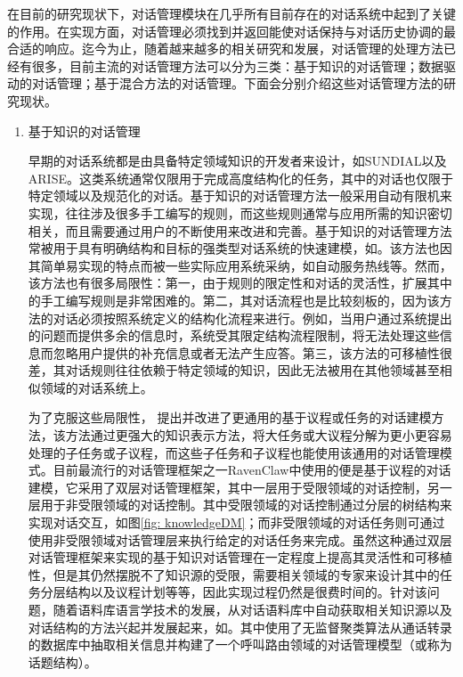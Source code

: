 在目前的研究现状下，对话管理模块在几乎所有目前存在的对话系统中起到了关键的作用。在实现方面，对话管理必须找到并返回能使对话保持与对话历史协调的最合适的响应。迄今为止，随着越来越多的相关研究和发展，对话管理的处理方法已经有很多，目前主流的对话管理方法可以分为三类：基于知识的对话管理；数据驱动的对话管理；基于混合方法的对话管理。下面会分别介绍这些对话管理方法的研究现状。

\begin{enumerate}

\item 基于知识的对话管理

早期的对话系统都是由具备特定领域知识的开发者来设计，如SUNDIAL\cite{Peckham1993}以及ARISE\cite{Lamel1999}。这类系统通常仅限用于完成高度结构化的任务，其中的对话也仅限于特定领域以及规范化的对话。基于知识的对话管理方法一般采用自动有限机来实现，往往涉及很多手工编写的规则，而这些规则通常与应用所需的知识密切相关，而且需要通过用户的不断使用来改进和完善。基于知识的对话管理方法常被用于具有明确结构和目标的强类型对话系统的快速建模，如\cite{McTear1998}。该方法也因其简单易实现的特点而被一些实际应用系统采纳，如自动服务热线等。然而，该方法也有很多局限性：第一，由于规则的限定性和对话的灵活性，扩展其中的手工编写规则是非常困难的。第二，其对话流程也是比较刻板的，因为该方法的对话必须按照系统定义的结构化流程来进行。例如，当用户通过系统提出的问题而提供多余的信息时，系统受其限定结构流程限制，将无法处理这些信息而忽略用户提供的补充信息或者无法产生应答。第三，该方法的可移植性很差，其对话规则往往依赖于特定领域的知识，因此无法被用在其他领域甚至相似领域的对话系统上。

为了克服这些局限性，\cite{RichSidner1998, BohusRudnicky2003, Bui2004, LarssonTraum2006} 提出并改进了更通用的基于议程或任务的对话建模方法，该方法通过更强大的知识表示方法，将大任务或大议程分解为更小更容易处理的子任务或子议程，而这些子任务和子议程也能使用该通用的对话管理模式。目前最流行的对话管理框架之一RavenClaw\cite{BohusRudnicky2009}中使用的便是基于议程的对话建模，它采用了双层对话管理框架，其中一层用于受限领域的对话控制，另一层用于非受限领域的对话控制。其中受限领域的对话控制通过分层的树结构来实现对话交互，如图\ref{fig: knowledgeDM}；而非受限领域的对话任务则可通过使用非受限领域对话管理层来执行给定的对话任务来完成。虽然这种通过双层对话管理框架来实现的基于知识对话管理在一定程度上提高其灵活性和可移植性，但是其仍然摆脱不了知识源的受限，需要相关领域的专家来设计其中的任务分层结构以及议程计划等等，因此实现过程仍然是很费时间的。针对该问题，随着语料库语言学技术的发展，从对话语料库中自动获取相关知识源以及对话结构的方法兴起并发展起来，如\cite{RoySubramaniam2006, Bangalore2006, Lee2009a, Griol2009}。其中\cite{RoySubramaniam2006}使用了无监督聚类算法从通话转录的数据库中抽取相关信息并构建了一个呼叫路由领域的对话管理模型（或称为话题结构）。


\end{enumerate}
